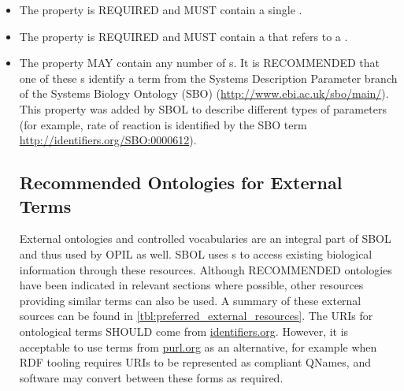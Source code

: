 \begin{itemize}
\item \label{sec:om:hasNumericalValue}
The  property is REQUIRED and MUST contain a single .

\item \label{sec:om:hasUnit:Measure}
The  property is REQUIRED and MUST contain a  that refers to a . 

\item \label{sec:sbol:type:Measure}
The  property MAY contain any number of s. It is RECOMMENDED that one of these s identify a term from the Systems Description Parameter branch of the Systems Biology Ontology (SBO) (\url{http://www.ebi.ac.uk/sbo/main/}). This  property was added by SBOL to describe different types of parameters 
(for example, rate of reaction is identified by the SBO term \url{http://identifiers.org/SBO:0000612}).


\subsection{Recommended Ontologies for External Terms}
\label{sec:recomm_ontologies}

External ontologies and controlled vocabularies are an integral part of SBOL and thus used by OPIL as well. SBOL uses s to access existing biological information through these resources. 
Although RECOMMENDED ontologies have been indicated in relevant sections where possible, other resources providing similar terms can also be used. A summary of these external sources can be found in \ref{tbl:preferred_external_resources}.
The URIs for ontological terms SHOULD come from \url{identifiers.org}.  However, it is acceptable to use terms from \url{purl.org} as an alternative, for example when RDF tooling requires URIs to be represented as compliant QNames, and software may convert between these forms as required.


\end{itemize}
